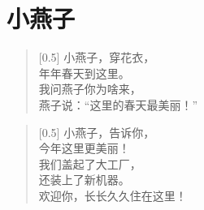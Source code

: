 \documentclass[12pt,UTF-8,openany]{ctexbook}
\begin{document}
\chapter{小燕子}

\begin{large}
    
    \begin{verse}[0.5\linewidth]
        小燕子，穿花衣， \\
        年年春天到这里。 \\
        我问燕子你为啥来， \\
        燕子说：“这里的春天最美丽！”
    \end{verse}
    
    
    \begin{verse}[0.5\linewidth]
        小燕子，告诉你， \\
        今年这里更美丽！ \\
        我们盖起了大工厂， \\
        还装上了新机器。 \\
        欢迎你，长长久久住在这里！
    \end{verse}
    
\end{large}


\clearpage

\begin{center}
    
    
\end{center}


\hanzibox{}\hanzibox{}\hanzibox{}\hanzibox{}\hspace{1em}\hanzibox{}\hanzibox{}\hanzibox{}\hanzibox{}

\hanzibox{}\hanzibox{}\hanzibox{}\hanzibox{}\hspace{1em}\hanzibox{}\hanzibox{}\hanzibox{}\hanzibox{}

\hanzibox{}\hanzibox{}\hanzibox{}\hanzibox{}\hspace{1em}\hanzibox{}\hanzibox{}\hanzibox{}\hanzibox{}

\hanzibox{}\hanzibox{}\hanzibox{}\hanzibox{}\hspace{1em}\hanzibox{}\hanzibox{}\hanzibox{}\hanzibox{}
\end{document}
